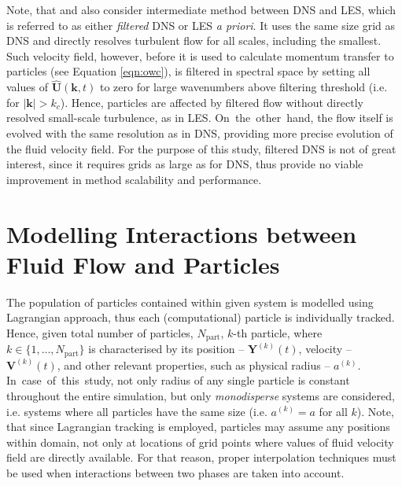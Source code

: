 \documentclass{pracamgren}
\begin{document}
\medskip

Note, that \textcite{Jin2010} and \textcite{Rosa2017} also consider intermediate method between DNS and LES, which is referred to as either \emph{filtered} DNS or LES \emph{a priori}.
It uses the same size grid as DNS and directly resolves turbulent flow for all scales, including the smallest.
Such velocity field, however, before it is used to calculate momentum transfer to particles (see Equation \ref{eqn:owc}), is filtered in spectral space by setting all values of $\hat{\mathbf{U}}(\mathbf{k}, t)$ to zero for large wavenumbers above filtering threshold (i.e. for $|\mathbf{k}| > k_c$).
Hence, particles are affected by filtered flow without directly resolved small-scale turbulence, as in LES.
On~the~other~hand, the flow itself is evolved with the same resolution as in DNS, providing more precise evolution of the fluid velocity field.
For the purpose of this study, filtered DNS is not of great interest, since it requires grids as large as for DNS, thus provide no viable improvement in method scalability and performance.
   

\section{Modelling Interactions between Fluid Flow and Particles}
\label{sc:ch1.part}

The population of particles contained within given system is modelled using Lagrangian approach, thus each (computational) particle is individually tracked.
Hence, given total number of particles, $N_{\text{part}}$, $k$-th particle, where $k \in \{ 1, \ldots , N_{\text{part}} \}$ is characterised by its position -- $\mathbf{Y}^{(k)}(t)$, velocity -- $\mathbf{V}^{(k)}(t)$, and other relevant properties, such as physical radius -- $a^{(k)}$.
In~case~of~this~study, not only radius of any single particle is constant throughout the entire simulation, but only \emph{monodisperse} systems are considered, i.e. systems where all particles have the same size (i.e. $a^{(k)} = a$ for all $k$).
Note, that since Lagrangian tracking is employed, particles may assume any positions within domain, not only at locations of grid points where values of fluid velocity field are directly available.
For that reason, proper interpolation techniques must be used when interactions between two phases are taken into account.
\end{document}
